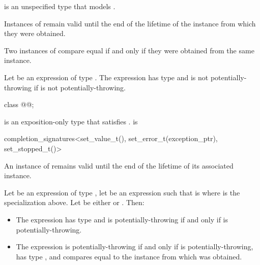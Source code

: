 \pnum
{} is an unspecified type
that models .

\pnum
Instances of  remain valid
until the end of the lifetime of the  instance
from which they were obtained.

\pnum
Two instances of  compare equal
if and only if they were obtained from the same  instance.

\pnum
Let  be an expression of type .
The expression 
has type  and
is not potentially-throwing if  is not potentially-throwing.

\begin{itemdecl}
class @@;
\end{itemdecl}

\pnum
{} is an exposition-only type
that satisfies .
 is
\begin{codeblock}
completion_signatures<set_value_t(), set_error_t(exception_ptr), set_stopped_t()>
\end{codeblock}

\pnum
An instance of  remains valid
until the end of the lifetime of its associated  instance.

\pnum
Let  be an expression of type ,
let  be an expression
such that  is 
where  is the  specialization above.
Let  be either  or .
Then:
\begin{itemize}
\item
The expression 
has type 
and is potentially-throwing if and only if
 is potentially-throwing.
\item
The expression 
is potentially-throwing if and only if  is potentially-throwing,
has type , and
compares equal to the  instance
from which  was obtained.
\end{itemize}

